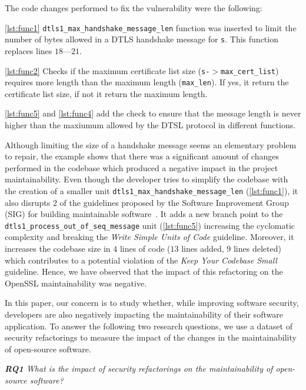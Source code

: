 \documentclass[10pt,conference]{IEEEtran}
\begin{document}
The code changes performed to fix the vulnerability were the following:

\ref{lst:func1} \texttt{dtls1\_max\_handshake\_message\_len} function was
inserted to limit the number of bytes allowed in a DTLS handshake message for
\texttt{s}. This function replaces lines $18$---$21$.

\ref{lst:func2} Checks if the maximum certificate list size
(\texttt{s-$>$max\_cert\_list}) requires more length than the maximum length
(\texttt{max\_len}). If yes, it return the certificate list size, if not it
return the maximum length.

\ref{lst:func5} and \ref{lst:func4} add the check to ensure that the message
length is never higher than the maxiumum allowed by the DTSL protocol in
different functions.

Although limiting the size of a handshake message seems an elementary problem to
repair, the example shows that there was a significant amount of changes
performed in the codebase which produced a negative impact in the project
maintainability. Even though the developer tries to simplify the codebase with
the creation of a smaller unit \texttt{dtls1\_max\_handshake\_message\_len} (\ref{lst:func1}), it
also disrupts $2$ of the guidelines proposed by the Software Improvement Group
(SIG) for building maintainable software~\cite{Visser:2016:OREILLY}. It adds a
new branch point to the \texttt{dtls1\_process\_out\_of\_seq\_message} unit
(\ref{lst:func5}) increasing the cyclomatic complexity and breaking the
\emph{Write Simple Units of Code} guideline. Moreover, it increases the codebase
size in $4$ lines of code ($13$ lines added, $9$ lines deleted) which contributes
to a potential violation of the
\emph{Keep Your Codebase Small} guideline. Hence, we have observed that the
impact of this refactoring on the OpenSSL maintainability was negative.

In this paper, our concern is to study whether, while improving software
security, developers are also negatively impacting the maintainability
of their software application. To answer the following two
research questions, we use a dataset of security refactorings to measure the
impact of the changes in the maintainability of open-source software.

\begin{framed}
\textit{\textbf{RQ1} What is the impact of security refactorings on the
maintainability of open-source software?}
\end{framed}
\end{document}
